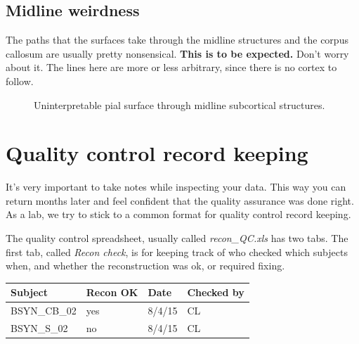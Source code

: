 \documentclass[letterpaper,10pt,openany,oneside]{sphinxmanual}
\begin{document}
\subsection{Midline weirdness}
\label{surface_reconstruction:midline-weirdness}
The paths that the surfaces take through the midline structures and the corpus
callosum are usually pretty nonsensical. \textbf{This is to be expected.} Don't
worry about it. The lines here are more or less arbitrary, since there is no
cortex to follow.
\begin{figure}[htbp]
\centering
\capstart

\caption{Uninterpretable pial surface through midline subcortical structures.}\end{figure}


\section{Quality control record keeping}
\label{surface_reconstruction:freesurfer-white-matter-edit-tutorial}\label{surface_reconstruction:quality-control-record-keeping}
It's very important to take notes while inspecting your data. This way you can
return months later and feel confident that the quality assurance was done
right. As a lab, we try to stick to a common format for quality control record
keeping.

The quality control spreadsheet, usually called \emph{recon\_QC.xls} has two tabs.
The first tab, called \emph{Recon check}, is for keeping track of who checked which
subjects when, and whether the reconstruction was ok, or required fixing.

\begin{tabulary}{\linewidth}{|L|L|L|L|}
\hline
\textsf{\relax 
Subject
} & \textsf{\relax 
Recon OK
} & \textsf{\relax 
Date
} & \textsf{\relax 
Checked by
}\\
\hline
BSYN\_CB\_02
 & 
yes
 & 
8/4/15
 & 
CL
\\

BSYN\_S\_02
 & 
no
 & 
8/4/15
 & 
CL
\\
\hline\end{tabulary}
\end{document}
